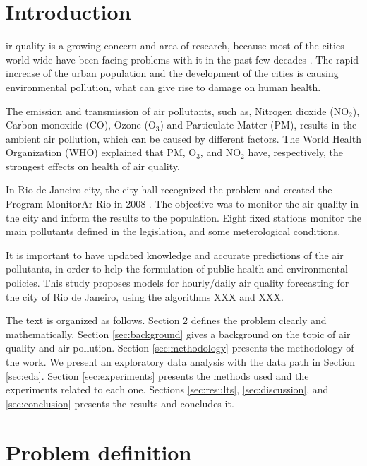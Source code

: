 \section{Introduction}
\label{sec:introduction}

ir quality is a growing concern and area
of research, because most of the cities world-wide have been facing problems with it in
the past few decades \cite{mayer1999}. The rapid increase of the urban
population and the development of the cities is causing environmental
pollution, what can give rise to damage on human health. 

The emission and
transmission of air pollutants, such as, Nitrogen dioxide (NO$_2$), Carbon
monoxide (CO), Ozone (O$_3$)
and Particulate Matter (PM), results in the ambient air pollution, which can be
caused by different factors. The World Health
Organization (WHO) explained \cite{who2006} that PM, O$_3$, and NO$_2$ have, respectively, the
strongest effects on health of air quality. 

In Rio de Janeiro city, the city hall recognized the problem and created the
Program MonitorAr-Rio in 2008 \cite{relatorio2011}. The objective was to
monitor the air quality in the city and inform the results to the population.
Eight fixed stations monitor the main pollutants defined in the legislation,
and some meterological conditions. 

It is important to have updated knowledge and accurate predictions of the
air pollutants, in order to help the formulation of public health and
environmental policies. This study proposes models for hourly/daily air
quality forecasting for the city of Rio de Janeiro, using the algorithms XXX
and XXX. 

The text is organized as follows. Section \ref{sec:problem-definition} defines
the problem clearly and mathematically. Section \ref{sec:background} gives a
background on the topic of air quality and air pollution. Section \ref{sec:methodology} presents
the methodology of the work. We present an exploratory data analysis with the
data path in Section \ref{sec:eda}. Section \ref{sec:experiments} presents the
methods used and the experiments related to each one. Sections
\ref{sec:results}, \ref{sec:discussion}, and \ref{sec:conclusion} presents the
results and concludes it. 


\section{Problem definition}
\label{sec:problem-definition}

